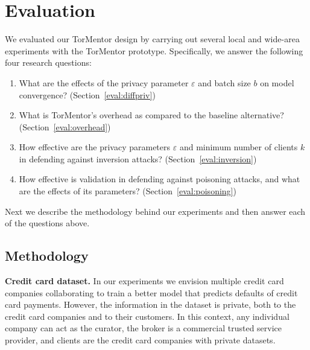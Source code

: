 \chapter{Evaluation}
\label{sec:eval}

We evaluated our TorMentor design by carrying out several local
and wide-area experiments with the TorMentor prototype. Specifically,
we answer the following four research questions:

\begin{enumerate}

\item What are the effects of the privacy parameter $\varepsilon$ and
  batch size $b$ on model convergence?  (Section~\ref{eval:diffpriv})

\item What is TorMentor's overhead as compared to the baseline
  alternative? (Section~\ref{eval:overhead})
  
\item How effective are the privacy parameters $\varepsilon$ and
  minimum number of clients $k$ in defending against inversion
  attacks?  (Section~\ref{eval:inversion})
  
\item How effective is validation in defending against poisoning
  attacks, and what are the effects of its parameters?
  (Section~\ref{eval:poisoning})

\end{enumerate}

Next we describe the methodology behind our experiments and then
answer each of the questions above.

\section{Methodology}
\label{eval:method}

\textbf{Credit card dataset.} In our experiments we envision multiple
credit card companies collaborating to train a better model that
predicts defaults of credit card payments. However, the information in
the dataset is private, both to the credit card companies and to their
customers. In this context, any individual company can act as the
curator, the broker is a commercial trusted service provider, and
clients are the credit card companies with private datasets.

